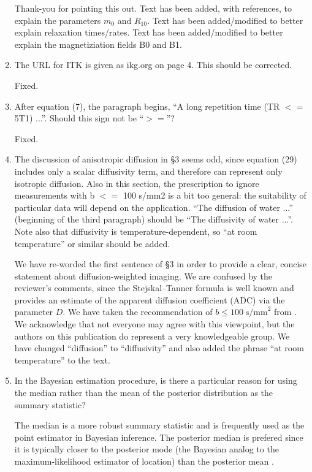 \documentclass[11pt]{article}
\begin{document}
\begin{enumerate}
  Thank-you for pointing this out.  Text has been added, with
  references, to explain the parameters $m_0$ and $R_{10}$.  Text has
  been added/modified to better explain relaxation times/rates.  Text
  has been added/modified to better explain the magnetiziation fields
  B0 and B1.

\item The URL for ITK is given as ikg.org on page 4. This should be
  corrected.

  Fixed.

\item After equation (7), the paragraph begins, ``A long repetition
  time (TR $<=$ 5T1) ...''. Should this sign not be ``$>=$''?

  Fixed.

\item The discussion of anisotropic diffusion in \S3 seems odd, since
  equation (29) includes only a scalar diffusivity term, and therefore
  can represent only isotropic diffusion. Also in this section, the
  prescription to ignore measurements with b $<=$ 100 s/mm2 is a bit
  too general: the suitability of particular data will depend on the
  application. ``The diffusion of water ...'' (beginning of the third
  paragraph) should be ``The diffusivity of water ...''. Note also
  that diffusivity is temperature-dependent, so ``at room
  temperature'' or similar should be added.

  We have re-worded the first sentence of \S3 in order to provide a
  clear, concise statement about diffusion-weighted imaging.  We are
  confused by the reviewer's comments, since the Stejskal--Tanner
  formula is well known and provides an estimate of the apparent
  diffusion coefficient (ADC) via the parameter $D$.  We have taken
  the recommendation of $b\leq100\;\text{s/mm}^2$ from
  \cite{pad-etal:neoplasia}.  We acknowledge that not everyone may
  agree with this viewpoint, but the authors on this publication do
  represent a very knowledgeable group.  We have changed ``diffusion''
  to ``diffusivity'' and also added the phrase ``at room temperature''
  to the text.

\item In the Bayesian estimation procedure, is there a particular
  reason for using the median rather than the mean of the posterior
  distribution as the summary statistic?

  The median is a more robust summary statistic and is frequently used
  as the point estimator in Bayesian inference.  The posterior median
  is prefered since it is typically closer to the posterior mode (the
  Bayesian analog to the maximum-likelihood estimator of location)
  than the posterior mean \citep{car-lou:Bayesian}.


\end{enumerate}
\end{document}

